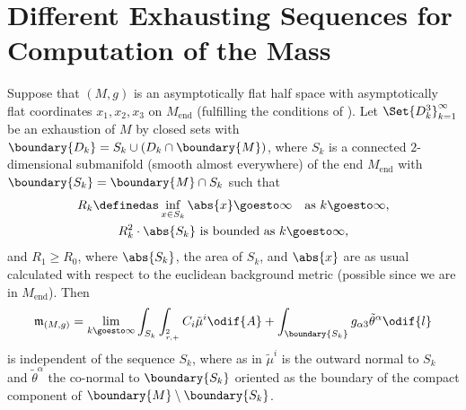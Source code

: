 \documentclass[titlepage,numbers=noenddot,headinclude,oneside,%
footinclude=true,cleardoublepage=empty,%
BCOR=5mm,paper=a4,fontsize=11pt,%
english,%
]{scrartcl}
\let\sphere\relax
\newcommand{\sphere}{\mathbb{S}}
\newcommand{\Mend}{M_{\mathrm{end}}} %
\newcommand{\mass}[2]{\mathfrak{m}_{(#1,#2)}} %
\begin{document}
\newpage
\appendix
\section{Different Exhausting Sequences for Computation of the Mass}
\begin{proposition}\label{prop:mass_independent_of_exhausting_sequence}
    Suppose that \( (M,g) \) is an asymptotically flat half space with asymptotically flat coordinates \( x_1,x_2,x_3 \) on \( \Mend \) (fulfilling the conditions of ). Let \( \Set{D_k^3}_{k=1}^{\infty} \) be an exhaustion of \( M \) by closed sets with \( \boundary{D_k}=S_k\cup (D_k\cap \boundary{M}) \), where \( S_k \) is a connected \( 2 \)-dimensional submanifold (smooth almost everywhere) of the end \( \Mend \) with \( \boundary{S_k}=\boundary{M}\cap S_k \) such that
    \begin{gather*}
        R_k\definedas \inf_{x\in S_k} \abs{x}\goesto \infty\quad \text{as \( k\goesto \infty \)},\\
        R_k^2\cdot \abs{S_k} \text{ is bounded as \( k\goesto \infty \)},
    \end{gather*}
    and \( R_1\geq R_0 \), where \( \abs{S_k} \), the area of \( S_k \), and \( \abs{x} \) are as usual calculated with respect to the euclidean background metric (possible since we are in \( \Mend \)). Then
    \begin{equation*}
        \mass{M}{g}=\lim_{k \goesto \infty}\int_{S_k}\int_{\sphere_{r,+}^{2}}C_i\tilde{\mu}^i\odif{A}+\int_{\boundary{S_k}}g_{\alpha 3}\tilde{\theta}^\alpha\odif{l}
    \end{equation*}
    is independent of the sequence \( S_k \), where as in  \( \tilde{\mu}^i \) is the outward normal to \( S_k \) and \( \tilde{\theta}^\alpha \) the co-normal to \( \boundary{S_k} \) oriented as the boundary of the compact component of \( \boundary{M}\setminus \boundary{S_k} \).
\end{proposition}
\end{document}
